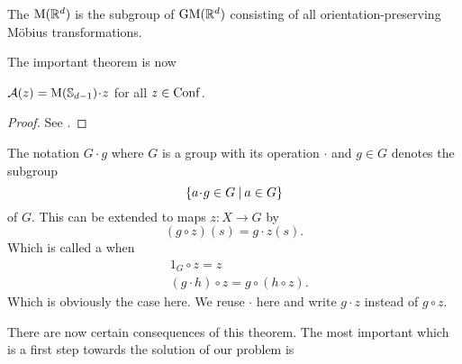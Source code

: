 \begin{definition}
    The  $\operatorname{M}(\mathbb{R}^d)$ is the subgroup of $\operatorname{GM}(\mathbb{R}^d)$ consisting of
    all orientation-preserving Möbius transformations.
\end{definition}

The important theorem is now
\begin{theorem}\label{theo:AccDescr}
    $\mathcal{A}(z) = \M(\Sd{d-1}) \cdot z$ for all $z \in \operatorname{Conf}$.
    \begin{proof}
        See \cite[Theorem 3.7]{Rodriguez07}.
    \end{proof}
\end{theorem}

\begin{remark}
    The notation $G \cdot g$ where $G$ is a group with its operation $\cdot$ and
    $g \in G$ denotes the subgroup
        \[ \setDef{a \cdot g \in G}{a \in G} \]
    of $G$. This can be extended to maps $z : X \rightarrow G$ by
        \[ (g \circ z)(s) = g \cdot z(s) . \]
    Which is called a  when
    \begin{align}
        & 1_G \circ z = z \\
        & (g \cdot h) \circ z = g \circ (h \circ z).
    \end{align}
    Which is obviously the case here. We reuse $\cdot$ here and write $g \cdot z$
    instead of $g \circ z$.
\end{remark}

There are now certain consequences of this theorem. The most important which is a first
step towards the solution of our problem is


